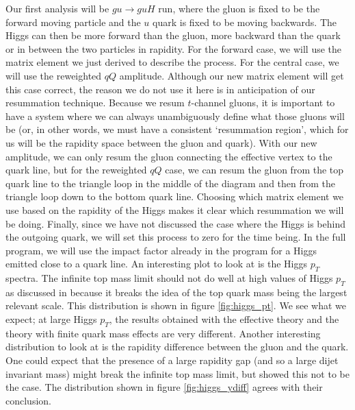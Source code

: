 Our first analysis will be $gu \to guH$ run, where the gluon is fixed to be the forward moving particle and the $u$ quark is fixed to be moving backwards. The Higgs can then be more forward than the gluon, more backward than the quark or in between the two particles in rapidity. For the forward case, we will use the matrix element we just derived to describe the process. For the central case, we will use the reweighted $qQ$ amplitude. Although our new matrix element will get this case correct, the reason we do not use it here is in anticipation of our resummation technique. Because we resum $t$-channel gluons, it is important to have a system where we can always unambiguously define what those gluons will be (or, in other words, we must have a consistent `resummation region', which for us will be the rapidity space between the gluon and quark). With our new amplitude, we can only resum the gluon connecting the effective vertex to the quark line, but for the reweighted $qQ$ case, we can resum the gluon from the top quark line to the triangle loop in the middle of the diagram and then from the triangle loop down to the bottom quark line. Choosing which matrix element we use based on the rapidity of the Higgs makes it clear which resummation we will be doing. Finally, since we have not discussed the case where the Higgs is behind the outgoing quark, we will set this process to zero for the time being. In the full program, we will use the impact factor already in the program for a Higgs emitted close to a quark line. An interesting plot to look at is the Higgs $p_T$ spectra. The infinite top mass limit should not do well at high values of Higgs $p_T$ as discussed in \cite{Duca2003} because it breaks the idea of the top quark mass being the largest relevant scale. This distribution is shown in figure \ref{fig:higgs_pt}. We see what we expect; at large Higgs $p_T$, the results obtained with the effective theory and the theory with finite quark mass effects are very different. Another interesting distribution to look at is the rapidity difference between the gluon and the quark. One could expect that the presence of a large rapidity gap (and so a large dijet invariant mass) might break the infinite top mass limit, but \cite{Duca2003} showed this not to be the case. The distribution shown in figure \ref{fig:higgs_ydiff} agrees with their conclusion. 

